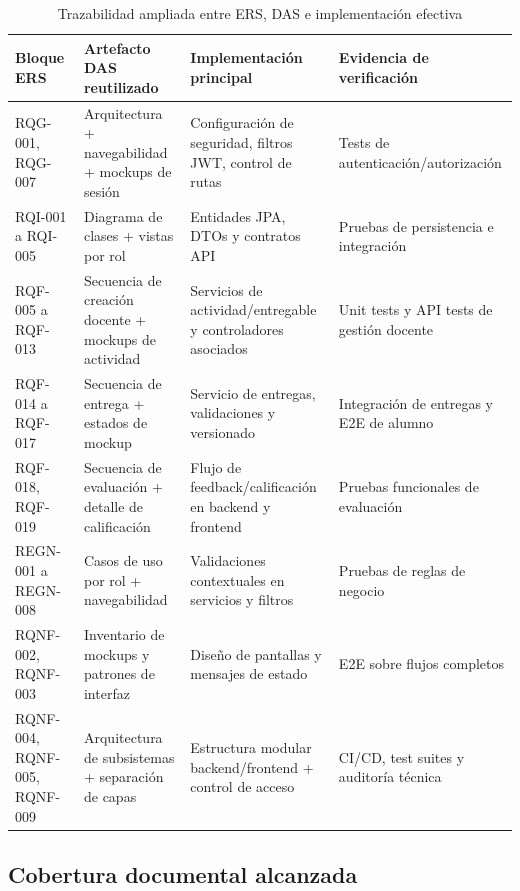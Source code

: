 \begin{table}[!htbp]
\centering
\small
\begin{tabular}{|P{2.5cm}|P{3.5cm}|P{3.0cm}|P{2.9cm}|}
\hline
\textbf{Bloque ERS} & \textbf{Artefacto DAS reutilizado} & \textbf{Implementaci\'on principal} & \textbf{Evidencia de verificaci\'on} \\
\hline
RQG-001, RQG-007 & Arquitectura + navegabilidad + mockups de sesi\'on & Configuraci\'on de seguridad, filtros JWT, control de rutas & Tests de autenticaci\'on/autorizaci\'on \\
\hline
RQI-001 a RQI-005 & Diagrama de clases + vistas por rol & Entidades JPA, DTOs y contratos API & Pruebas de persistencia e integraci\'on \\
\hline
RQF-005 a RQF-013 & Secuencia de creaci\'on docente + mockups de actividad & Servicios de actividad/entregable y controladores asociados & Unit tests y API tests de gesti\'on docente \\
\hline
RQF-014 a RQF-017 & Secuencia de entrega + estados de mockup & Servicio de entregas, validaciones y versionado & Integraci\'on de entregas y E2E de alumno \\
\hline
RQF-018, RQF-019 & Secuencia de evaluaci\'on + detalle de calificaci\'on & Flujo de feedback/calificaci\'on en backend y frontend & Pruebas funcionales de evaluaci\'on \\
\hline
REGN-001 a REGN-008 & Casos de uso por rol + navegabilidad & Validaciones contextuales en servicios y filtros & Pruebas de reglas de negocio \\
\hline
RQNF-002, RQNF-003 & Inventario de mockups y patrones de interfaz & Dise\~no de pantallas y mensajes de estado & E2E sobre flujos completos \\
\hline
RQNF-004, RQNF-005, RQNF-009 & Arquitectura de subsistemas + separaci\'on de capas & Estructura modular backend/frontend + control de acceso & CI/CD, test suites y auditor\'ia t\'ecnica \\
\hline
\end{tabular}
\normalsize
\caption{Trazabilidad ampliada entre ERS, DAS e implementaci\'on efectiva}
\label{tab:trazabilidad-ampliada}
\end{table}

\FloatBarrier

\subsection{Cobertura documental alcanzada}

